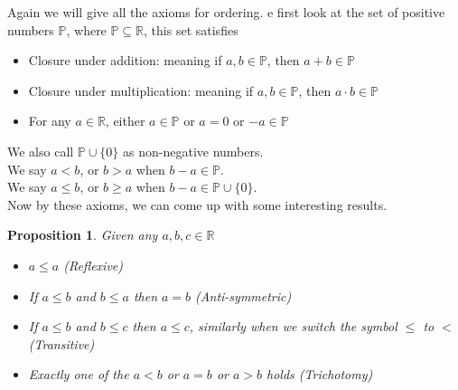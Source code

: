 \documentclass{book}
\newtheorem{proposition}[theorem]{Proposition}
\begin{document}
Again we will give all the axioms for ordering. e first look at the set of positive numbers $\mathbb{P}$, where $\mathbb{P} \subseteq \mathbb{R}$, this set satisfies

\begin{itemize}
    \item Closure under addition: meaning if $a, b \in \mathbb{P}$, then $a + b \in \mathbb{P}$
    \item Closure under multiplication: meaning if $a, b \in \mathbb{P}$, then $a \cdot b \in \mathbb{P}$
    \item For any $a \in \mathbb{R}$, either $a \in \mathbb{P}$ or $a = 0$ or $-a \in \mathbb{P}$
\end{itemize}
We also call $\mathbb{P} \cup \{ 0 \}$ as non-negative numbers. \\
We say $a < b$, or $b > a$ when $b - a \in \mathbb{P}$. \\
We say $a \leq b$, or $b \geq a$ when $b - a \in \mathbb{P} \cup \{ 0 \}$. \\
Now by these axioms, we can come up with some interesting results.

\begin{proposition}
    Given any $a, b, c \in \mathbb{R}$
    \begin{itemize}[itemsep = 0pt]
        \item[(1)] $a \leq a$ (Reflexive)
        \item[(2)] If $a \leq b$ and $b \leq a$ then $a = b$ (Anti-symmetric)
        \item[(3)] If $a \leq b$ and $b \leq c$ then $a \leq c$, similarly when we switch the symbol $\leq$ to $<$ (Transitive)
        \item[(4)] Exactly one of the $a < b$ or $a = b$ or $a > b$ holds (Trichotomy)
    \end{itemize}
\end{proposition}
\end{document}
